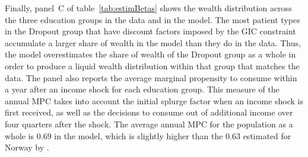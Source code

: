 \documentclass[../HAFiscal]{subfiles}
\begin{document}
Finally, panel~C of table~\ref{tab:estimBetas} shows the wealth distribution across the three education groups in the data and in the model. The most patient types in the Dropout group that have discount factors imposed by the GIC constraint accumulate a larger share of wealth in the model than they do in the data. Thus, the model overestimates the share of wealth of the Dropout group as a whole in order to produce a liquid wealth distribution within that group that matches the data. The panel also reports the average marginal propensity to consume within a year after an income shock for each education group. This measure of the annual MPC takes into account the initial splurge factor when an income shock is first received, as well as the decisions to consume out of additional income over four quarters after the shock. The average annual MPC for the population as a whole is $0.69$ in the model, which is slightly higher than the $0.63$ estimated for Norway by \cite{fagereng_mpc_2021}. 
\end{document}

